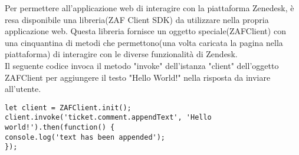 Per permettere all'applicazione web di interagire con la piattaforma Zenedesk, è resa disponibile una libreria(ZAF Client SDK) da utilizzare nella propria applicazione web. Questa libreria fornisce un oggetto speciale(ZAFClient) con una cinquantina di metodi che permettono(una volta caricata la pagina nella piattaforma) di interagire con le diverse funzionalità di Zendesk.
\\

Il seguente codice invoca il metodo "invoke" dell'istanza "client" dell'oggetto ZAFClient per aggiungere il testo "Hello World!" nella risposta da inviare all'utente.  
\\
\begin{lstlisting}
let client = ZAFClient.init();
client.invoke('ticket.comment.appendText', 'Hello world!').then(function() {
console.log('text has been appended');
});
\end{lstlisting} 